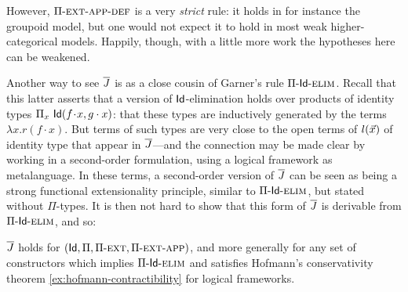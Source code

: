However, ${\Pi\mbox{-}\textsc{ext}\mbox{-}\textsc{app}}\mbox{-}\textsc{def}$ is a very \emph{strict} rule: it holds in for instance the groupoid model, but one would not expect it to hold in most weak higher-categorical models.  Happily, though, with a little more work the hypotheses here can be weakened.

Another way to see $\overline{J}$ is as a close cousin of Garner's rule ${\Pi\mbox{-}\mathsf{Id}\mbox{-}\textsc{elim}}$.  Recall that this latter asserts that a version of $\mathsf{Id}$-elimination holds over products of identity types $\Pi_x\ \Id(f \tightcdot x, g \cdot x)$: that these types are inductively generated by the terms $\lambda x. r(f \cdot x)$.  But terms of such types are very close to the open terms of $l(\vec x)$ of identity type that appear in $\overline{J}$---and the connection may be made clear by working in a second-order formulation, using a logical framework as metalanguage.  In these terms, a second-order version of $\overline{J}$ can be seen as being a strong functional extensionality principle, similar to ${\Pi\mbox{-}\mathsf{Id}\mbox{-}\textsc{elim}}$, but stated without $\Pi$-types.   It is then not hard to show that this form of $\overline{J}$ is derivable from ${\Pi\mbox{-}\mathsf{Id}\mbox{-}\textsc{elim}}$, and so:

\begin{proposition}\label{prop:jbar-holds-2}
$\overline{J}$ holds for $(\mathsf{Id},\Pi,{\Pi\mbox{-}\textsc{ext}},{\Pi\mbox{-}\textsc{ext}\mbox{-}\textsc{app}})$, and more generally for any set of constructors which implies ${\Pi\mbox{-}\mathsf{Id}\mbox{-}\textsc{elim}}$ and satisfies Hofmann's conservativity theorem \ref{ex:hofmann-contractibility} for logical frameworks.
\end{proposition}


